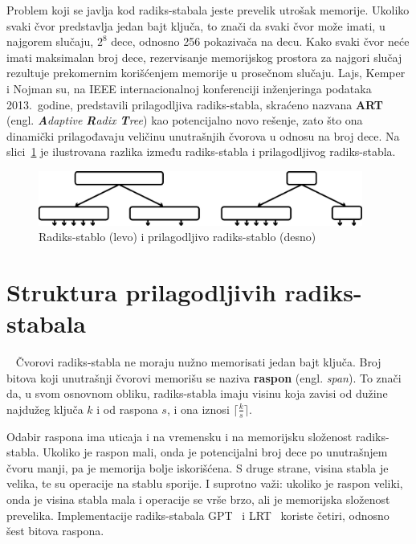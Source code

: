 \documentclass[12pt,oneside]{memoir}
\begin{document}
Problem koji se javlja kod radiks-stabala jeste prevelik utrošak memorije.
Ukoliko svaki čvor predstavlja jedan bajt ključa, to znači da
svaki čvor može imati, u najgorem slučaju, $ 2^{8} $ dece,
odnosno 256 pokazivača na decu.
Kako svaki čvor neće imati maksimalan broj dece, rezervisanje memorijskog prostora
za najgori slučaj rezultuje prekomernim korišćenjem memorije u prosečnom slučaju.
Lajs, Kemper i Nojman su, na IEEE internacionalnoj konferenciji inženjeringa
podataka 2013.\ godine, predstavili prilagodljiva radiks-stabla,
skraćeno nazvana \textbf{ART}~\cite{artful}
(engl. \emph{\textbf{A}daptive \textbf{R}adix \textbf{T}ree})
kao potencijalno novo rešenje, zato što ona dinamički
prilagođavaju veličinu unutrašnjih čvorova u odnosu na broj dece.
Na slici~\ref{fig:radix_v_art} je ilustrovana razlika između radiks-stabla i
prilagodljivog radiks-stabla.

\hspace{10pt}
\begin{figure}[!h]
  \centering
  \includegraphics[width=0.95\textwidth]{radix_v_art.eps}
  \caption{
    Radiks-stablo (levo) i prilagodljivo radiks-stablo (desno)
  }
  \label{fig:radix_v_art}
\end{figure}

\section{Struktura prilagodljivih radiks-stabala}~\label{sec:struktura_art}
Čvorovi radiks-stabla ne moraju nužno memorisati jedan bajt ključa.
Broj bitova koji unutrašnji čvorovi memorišu se naziva \textbf{raspon} (engl. \emph{span}).
To znači da, u svom osnovnom obliku, radiks-stabla imaju visinu koja zavisi od
dužine najdužeg ključa $k$ i od raspona $s$, i ona iznosi $ \lceil \frac{k}{s} \rceil $.

Odabir raspona ima uticaja i na vremensku i na memorijsku složenost
radiks-stabla. Ukoliko je raspon mali, onda je potencijalni broj dece po
unutrašnjem čvoru manji, pa je memorija bolje iskorišćena. S druge strane,
visina stabla je velika, te su operacije na stablu sporije.
I suprotno važi: ukoliko je raspon veliki,
onda je visina stabla mala i operacije se vrše brzo, ali je memorijska složenost
prevelika. Implementacije radiks-stabala GPT~\cite{gpt} i LRT~\cite{lrt}
koriste četiri, odnosno šest bitova raspona.
\end{document}

